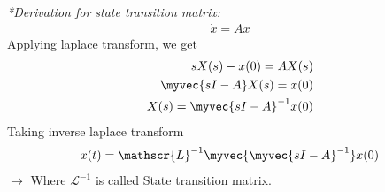 \begin{enumerate}[label=\thesubsection.\arabic*.,ref=\thesubsection.\theenumi]
\emph{*Derivation for state transition matrix:}
\begin{align}
    \dot{x} =Ax
\end{align} 
Applying laplace transform, we get
\begin{align}
    sX(s) -x(0) = AX(s)\\
    \myvec{sI - A}X(s) = x(0)\\
    X(s) = \myvec{sI - A}^{-1}x(0)\\
\end{align} 
Taking inverse laplace transform
\begin{align}
    x(t) = \mathscr{L}^{-1}\myvec{\myvec{sI -A}^{-1}}x(0)
\end{align}
$\to$ Where $\mathscr{L}^{-1}$ is called State transition matrix.
\end{enumerate}
